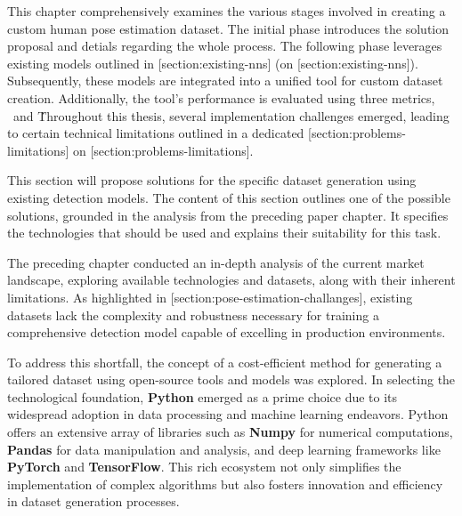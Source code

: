 This chapter comprehensively examines the various stages involved in creating a custom human pose estimation dataset. The initial phase introduces the solution proposal and detials regarding the whole process. The following phase leverages existing models outlined in [section:existing-nns] (on [section:existing-nns]). Subsequently, these models are integrated into a unified tool for custom dataset creation. Additionally, the tool's performance is evaluated using three metrics, \OKS\, \APE\ and \MSE\.

Throughout this thesis, several implementation challenges emerged, leading to certain technical limitations outlined in a dedicated [section:problems-limitations] on [section:problems-limitations].

This section will propose solutions for the specific dataset generation using existing {\bf \NN} detection models. The content of this section outlines one of the possible solutions, grounded in the analysis from the preceding paper chapter. It specifies the technologies that should be used and explains their suitability for this task.

The preceding chapter conducted an in-depth analysis of the current market landscape, exploring available technologies and datasets, along with their inherent limitations. As highlighted in [section:pose-estimation-challanges], existing datasets lack the complexity and robustness necessary for training a comprehensive detection model capable of excelling in production environments.

To address this shortfall, the concept of a cost-efficient method for generating a tailored dataset using open-source tools and models was explored. In selecting the technological foundation, {\bf Python} emerged as a prime choice due to its widespread adoption in data processing and machine learning endeavors. Python offers an extensive array of libraries such as {\bf Numpy} for numerical computations, {\bf Pandas} for data manipulation and analysis, and deep learning frameworks like {\bf PyTorch} and {\bf TensorFlow}. This rich ecosystem not only simplifies the implementation of complex algorithms but also fosters innovation and efficiency in dataset generation processes.

